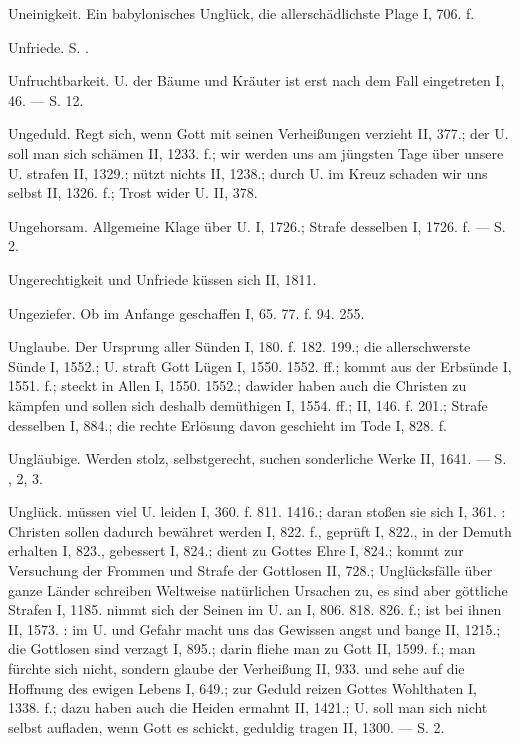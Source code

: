 Uneinigkeit. Ein babylonisches Unglück, die allerschädlichste Plage I, 706. f.

Unfriede. S. .

Unfruchtbarkeit. U. der Bäume und Kräuter ist erst nach dem Fall eingetreten I, 46. — S.  12.

Ungeduld. Regt sich, wenn Gott mit seinen Verheißungen verzieht II, 377.; der U. soll man sich schämen II, 1233. f.; wir werden uns am jüngsten Tage über unsere U. strafen II, 1329.; nützt nichts II, 1238.; durch U. im Kreuz schaden wir uns selbst II, 1326. f.; Trost wider U. II, 378.

Ungehorsam. Allgemeine Klage über U. I, 1726.; Strafe desselben I, 1726. f. — S.  2.

Ungerechtigkeit und Unfriede küssen sich II, 1811.

Ungeziefer. Ob im Anfange geschaffen I, 65. 77. f. 94. 255.

Unglaube. Der Ursprung aller Sünden I, 180. f. 182. 199.; die allerschwerste Sünde I, 1552.; U. straft Gott Lügen I, 1550. 1552. ff.; kommt aus der Erbsünde I, 1551. f.; steckt in Allen I, 1550. 1552.; dawider haben auch die Christen zu kämpfen und sollen sich deshalb demüthigen I, 1554. ff.; II, 146. f. 201.; Strafe desselben I, 884.; die rechte Erlösung davon geschieht im Tode I, 828. f.

Ungläubige. Werden stolz, selbstgerecht, suchen sonderliche Werke II, 1641. — S. ,  2, 3.

Unglück.  müssen viel U. leiden I, 360. f. 811. 1416.; daran stoßen sie sich I, 361. : Christen sollen dadurch bewähret werden I, 822. f., geprüft I, 822., in der Demuth erhalten I, 823., gebessert I, 824.; dient zu Gottes Ehre I, 824.; kommt zur Versuchung der Frommen und Strafe der Gottlosen II, 728.; Unglücksfälle über ganze Länder schreiben Weltweise natürlichen Ursachen zu, es sind aber göttliche Strafen I, 1185.  nimmt sich der Seinen im U. an I, 806. 818. 826. f.; ist bei ihnen II, 1573. : im U. und Gefahr macht uns das Gewissen angst und bange II, 1215.; die Gottlosen sind verzagt I, 895.; darin fliehe man zu Gott II, 1599. f.; man fürchte sich nicht, sondern glaube der Verheißung II, 933. und sehe auf die Hoffnung des ewigen Lebens I, 649.; zur Geduld reizen Gottes Wohlthaten I, 1338. f.; dazu haben auch die Heiden ermahnt II, 1421.; U. soll man sich nicht selbst aufladen, wenn Gott es schickt, geduldig tragen II, 1300. — S.  2.


